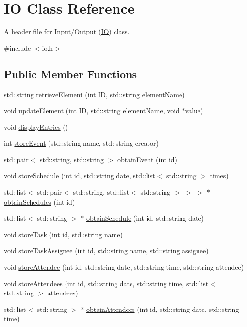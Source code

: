 \hypertarget{classIO}{}\section{IO Class Reference}
\label{classIO}


A header file for Input/\+Output (\hyperlink{classIO}{IO}) class.  




{\ttfamily \#include $<$io.\+h$>$}

\subsection*{Public Member Functions}
\begin{DoxyCompactItemize}
\item 
std\+::string \hyperlink{classIO_a3829dc8ad91e1f2d560be799b6d9b04d}{retrieve\+Element} (int ID, std\+::string element\+Name)
\item 
void \hyperlink{classIO_a11fdb7d4afa830fa1441fbf566f73432}{update\+Element} (int ID, std\+::string element\+Name, void $\ast$value)
\item 
void \hyperlink{classIO_a48e9febfbb2c6c3e01b467fd030c2529}{display\+Entries} ()
\item 
int \hyperlink{classIO_ac9a8c18ea44f8ced444effc51633e4d7}{store\+Event} (std\+::string name, std\+::string creator)
\item 
std\+::pair$<$ std\+::string, std\+::string $>$ \hyperlink{classIO_a1a083567d802a67de01512353a64882f}{obtain\+Event} (int id)
\item 
void \hyperlink{classIO_a9030b5cd77c0b621f8ecd36d1bc6b36d}{store\+Schedule} (int id, std\+::string date, std\+::list$<$ std\+::string $>$ times)
\item 
std\+::list$<$ std\+::pair$<$ std\+::string, std\+::list$<$ std\+::string $>$ $>$ $>$ $\ast$ \hyperlink{classIO_ae36363fbeda79e6e3f962d9e985eb23b}{obtain\+Schedules} (int id)
\item 
std\+::list$<$ std\+::string $>$ $\ast$ \hyperlink{classIO_a2d8629709827d3797b4f26b9ef108f03}{obtain\+Schedule} (int id, std\+::string date)
\item 
void \hyperlink{classIO_ad3e9360377df2dfaa223e36aa4a8edde}{store\+Task} (int id, std\+::string name)
\item 
void \hyperlink{classIO_a3b1673598595b2140f5f893d023813be}{store\+Task\+Assignee} (int id, std\+::string name, std\+::string assignee)
\item 
void \hyperlink{classIO_ae80862e6964e82c2f2e6d7f3b931f347}{store\+Attendee} (int id, std\+::string date, std\+::string time, std\+::string attendee)
\item 
void \hyperlink{classIO_ae1b8fcfab070b9af2dcd910c1cc7eb4e}{store\+Attendees} (int id, std\+::string date, std\+::string time, std\+::list$<$ std\+::string $>$ attendees)
\item 
std\+::list$<$ std\+::string $>$ $\ast$ \hyperlink{classIO_ab9ac9f637e042cd7711cfdbc4dcbe540}{obtain\+Attendees} (int id, std\+::string date, std\+::string time)
\end{DoxyCompactItemize}
